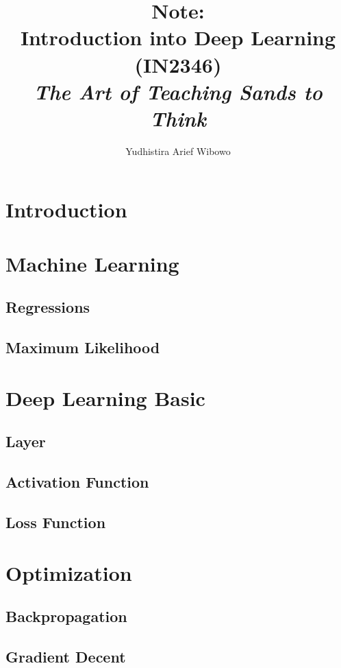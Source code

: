 \documentclass[10pt]{article}
\title{Note:\\Introduction into Deep Learning (IN2346)\\\vspace{0.5em}\large{\textit{The Art of Teaching Sands to Think}}}
\author{Yudhistira Arief Wibowo}
\begin{document}
\maketitle

\newpage

\section{Introduction}

\section{Machine Learning}

\subsection{Regressions}

\subsection{Maximum Likelihood}

\section{Deep Learning Basic}

\subsection{Layer}

\subsection{Activation Function}

\subsection{Loss Function}

\section{Optimization}

\subsection{Backpropagation}

\subsection{Gradient Decent}
\end{document}
